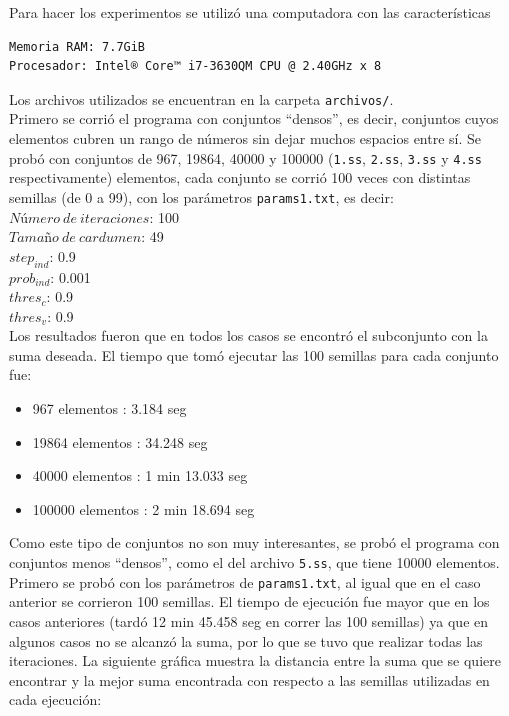 \documentclass[12pt]{article}
\begin{document}
Para hacer los experimentos se utilizó una computadora con las características
\begin{verbatim}
Memoria RAM: 7.7GiB 
Procesador: Intel® Core™ i7-3630QM CPU @ 2.40GHz x 8 
\end{verbatim}

Los archivos utilizados se encuentran en la carpeta \texttt{archivos/}. \\
Primero se corrió el programa con conjuntos ``densos'', es decir, conjuntos cuyos elementos cubren un rango de números sin dejar muchos espacios entre sí. Se probó con conjuntos de 967, 19864, 40000 y 100000 (\texttt{1.ss}, \texttt{2.ss}, \texttt{3.ss} y \texttt{4.ss} respectivamente) elementos, cada conjunto se corrió 100 veces con distintas semillas (de 0 a 99), con los parámetros \texttt{params1.txt}, es decir: \\

$Número\ de\ iteraciones$: 100 \\
$Tamaño\ de\ cardumen$: 49 \\
$step_{ind}$: 0.9 \\
$prob_{ind}$: 0.001 \\
$thres_c$: 0.9 \\
$thres_v$: 0.9 \\

Los resultados fueron que en todos los casos se encontró el subconjunto con la suma deseada. El tiempo que tomó ejecutar las 100 semillas para cada conjunto fue:

\begin{itemize}
\item 967 elementos : 3.184 seg
\item 19864 elementos : 34.248 seg
\item 40000 elementos : 1 min 13.033 seg
\item 100000 elementos : 2 min 18.694 seg
\end{itemize}

Como este tipo de conjuntos no son muy interesantes, se probó el programa con conjuntos menos ``densos'', como el del archivo \texttt{5.ss}, que tiene 10000 elementos. Primero se probó con los parámetros de \texttt{params1.txt}, al igual que en el caso anterior se corrieron 100 semillas. El tiempo de ejecución fue mayor que en los casos anteriores (tardó 12 min 45.458 seg en correr las 100 semillas) ya que en algunos casos no se alcanzó la suma, por lo que se tuvo que realizar todas las iteraciones. La siguiente gráfica muestra la distancia entre la suma que se quiere encontrar y la mejor suma encontrada con respecto a las semillas utilizadas en cada ejecución: \\
\end{document}
